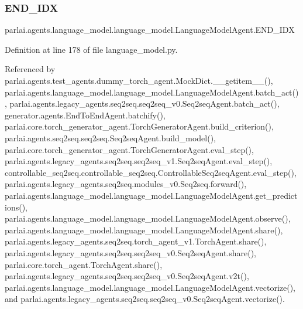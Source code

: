 \mbox{\label{classparlai_1_1agents_1_1language__model_1_1language__model_1_1LanguageModelAgent_affe3b740c3cdbac4f3883ff527091f47}} 
\subsubsection{\texorpdfstring{E\+N\+D\+\_\+\+I\+DX}{END\_IDX}}
{\footnotesize\ttfamily parlai.\+agents.\+language\+\_\+model.\+language\+\_\+model.\+Language\+Model\+Agent.\+E\+N\+D\+\_\+\+I\+DX}



Definition at line 178 of file language\+\_\+model.\+py.



Referenced by parlai.\+agents.\+test\+\_\+agents.\+dummy\+\_\+torch\+\_\+agent.\+Mock\+Dict.\+\_\+\+\_\+getitem\+\_\+\+\_\+(), parlai.\+agents.\+language\+\_\+model.\+language\+\_\+model.\+Language\+Model\+Agent.\+batch\+\_\+act(), parlai.\+agents.\+legacy\+\_\+agents.\+seq2seq.\+seq2seq\+\_\+v0.\+Seq2seq\+Agent.\+batch\+\_\+act(), generator.\+agents.\+End\+To\+End\+Agent.\+batchify(), parlai.\+core.\+torch\+\_\+generator\+\_\+agent.\+Torch\+Generator\+Agent.\+build\+\_\+criterion(), parlai.\+agents.\+seq2seq.\+seq2seq.\+Seq2seq\+Agent.\+build\+\_\+model(), parlai.\+core.\+torch\+\_\+generator\+\_\+agent.\+Torch\+Generator\+Agent.\+eval\+\_\+step(), parlai.\+agents.\+legacy\+\_\+agents.\+seq2seq.\+seq2seq\+\_\+v1.\+Seq2seq\+Agent.\+eval\+\_\+step(), controllable\+\_\+seq2seq.\+controllable\+\_\+seq2seq.\+Controllable\+Seq2seq\+Agent.\+eval\+\_\+step(), parlai.\+agents.\+legacy\+\_\+agents.\+seq2seq.\+modules\+\_\+v0.\+Seq2seq.\+forward(), parlai.\+agents.\+language\+\_\+model.\+language\+\_\+model.\+Language\+Model\+Agent.\+get\+\_\+predictions(), parlai.\+agents.\+language\+\_\+model.\+language\+\_\+model.\+Language\+Model\+Agent.\+observe(), parlai.\+agents.\+language\+\_\+model.\+language\+\_\+model.\+Language\+Model\+Agent.\+share(), parlai.\+agents.\+legacy\+\_\+agents.\+seq2seq.\+torch\+\_\+agent\+\_\+v1.\+Torch\+Agent.\+share(), parlai.\+agents.\+legacy\+\_\+agents.\+seq2seq.\+seq2seq\+\_\+v0.\+Seq2seq\+Agent.\+share(), parlai.\+core.\+torch\+\_\+agent.\+Torch\+Agent.\+share(), parlai.\+agents.\+legacy\+\_\+agents.\+seq2seq.\+seq2seq\+\_\+v0.\+Seq2seq\+Agent.\+v2t(), parlai.\+agents.\+language\+\_\+model.\+language\+\_\+model.\+Language\+Model\+Agent.\+vectorize(), and parlai.\+agents.\+legacy\+\_\+agents.\+seq2seq.\+seq2seq\+\_\+v0.\+Seq2seq\+Agent.\+vectorize().

